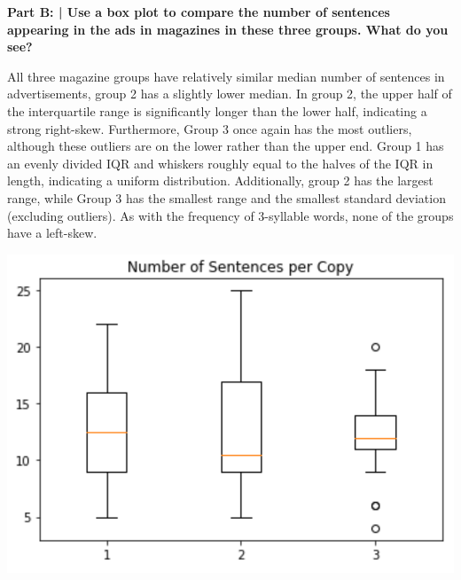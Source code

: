 \documentclass{article}
\begin{document}
 \newline

 \textbf{Part B: | Use a box plot to compare the number of sentences appearing in the ads in magazines in these three groups. What do you see?}\newline\newline
 
All three magazine groups have relatively similar median number of sentences in advertisements, group 2 has a slightly lower median. In group 2, the upper half of the interquartile range is significantly longer than the lower half, indicating a strong right-skew. Furthermore, Group 3 once again has the most outliers, although these outliers are on the lower rather than the upper end. Group 1 has an evenly divided IQR and whiskers roughly equal to the halves of the IQR in length, indicating a uniform distribution. Additionally, group 2 has the largest range, while Group 3 has the smallest range and the smallest standard deviation (excluding outliers). As with the frequency of 3-syllable words, none of the groups have a left-skew.\newline
 
 \includegraphics{HW1_6.PNG}
 
 
\end{document}
